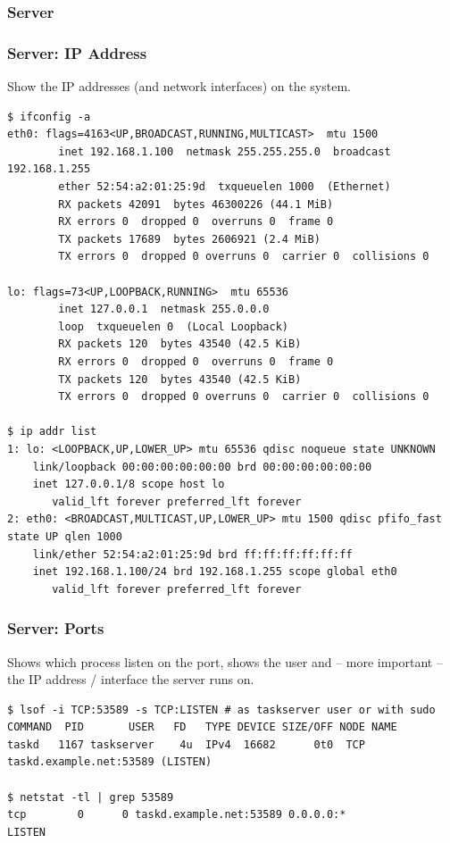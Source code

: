 \documentclass[t,handout]{beamer}
\begin{document}
\subsubsection{Server}

\begin{frame}[fragile]\frametitle{Server: IP Address}\label{S1}
    \vfill
    Show the IP addresses (and network interfaces) on the system.
    \begin{lstlisting}
$ ifconfig -a
eth0: flags=4163<UP,BROADCAST,RUNNING,MULTICAST>  mtu 1500
        inet 192.168.1.100  netmask 255.255.255.0  broadcast 192.168.1.255
        ether 52:54:a2:01:25:9d  txqueuelen 1000  (Ethernet)
        RX packets 42091  bytes 46300226 (44.1 MiB)
        RX errors 0  dropped 0  overruns 0  frame 0
        TX packets 17689  bytes 2606921 (2.4 MiB)
        TX errors 0  dropped 0 overruns 0  carrier 0  collisions 0

lo: flags=73<UP,LOOPBACK,RUNNING>  mtu 65536
        inet 127.0.0.1  netmask 255.0.0.0
        loop  txqueuelen 0  (Local Loopback)
        RX packets 120  bytes 43540 (42.5 KiB)
        RX errors 0  dropped 0  overruns 0  frame 0
        TX packets 120  bytes 43540 (42.5 KiB)
        TX errors 0  dropped 0 overruns 0  carrier 0  collisions 0

$ ip addr list
1: lo: <LOOPBACK,UP,LOWER_UP> mtu 65536 qdisc noqueue state UNKNOWN
    link/loopback 00:00:00:00:00:00 brd 00:00:00:00:00:00
    inet 127.0.0.1/8 scope host lo
       valid_lft forever preferred_lft forever
2: eth0: <BROADCAST,MULTICAST,UP,LOWER_UP> mtu 1500 qdisc pfifo_fast state UP qlen 1000
    link/ether 52:54:a2:01:25:9d brd ff:ff:ff:ff:ff:ff
    inet 192.168.1.100/24 brd 192.168.1.255 scope global eth0
       valid_lft forever preferred_lft forever\end{lstlisting}
\end{frame}

\begin{frame}[fragile]\frametitle{Server: Ports}\label{S2}
    \vfill
    Shows which process listen on the port, shows the user and -- more important -- the IP address / interface the server runs on.
    \begin{lstlisting}
$ lsof -i TCP:53589 -s TCP:LISTEN # as taskserver user or with sudo
COMMAND  PID       USER   FD   TYPE DEVICE SIZE/OFF NODE NAME
taskd   1167 taskserver    4u  IPv4  16682      0t0  TCP taskd.example.net:53589 (LISTEN)

$ netstat -tl | grep 53589
tcp        0      0 taskd.example.net:53589 0.0.0.0:*               LISTEN\end{lstlisting}
\end{frame}
\end{document}
